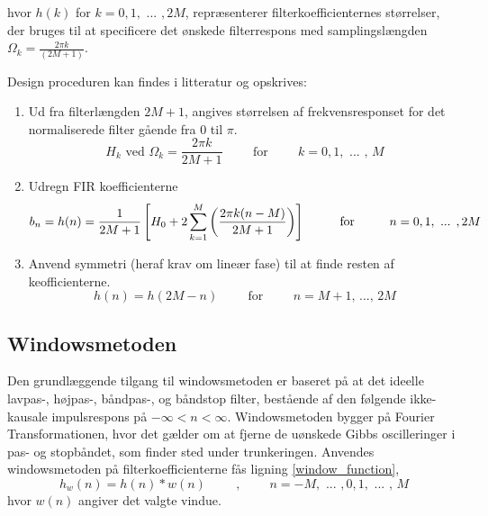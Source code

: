 hvor $h(k)$ for $k=0,1,\text{ ... },2M$, repræsenterer filterkoefficienternes størrelser, der bruges til at specificere det ønskede filterrespons med samplingslængden $\Omega_{k}=\frac{2\pi k}{(2M+1)}$.

Design proceduren kan findes i litteratur \cite[Side. 263]{Tan2013} og opskrives:\\
\begin{enumerate}
\item Ud fra filterlængden $2M+1$, angives størrelsen af frekvensresponset for det normaliserede filter gående fra $0$ til $\pi$.
\begin{equation}
	H_k \text{ ved } \Omega_{k} = \frac{2 \pi k}{2M+1} \hspace{1cm} \text{for} \hspace{1cm} k=0,1,\text{ ... , } M
\end{equation}
\item Udregn FIR koefficienterne
\begin{equation}
b_n = h(n)=\frac{1}{2M+1}\left[ H_{0}+2\sum_{k=1}^{M} \left( \frac{2\pi k(n-M)}{2M+1} \right) \right] \hspace{1cm} \text{for} \hspace{1 cm} n=0,1,\text{ ... },2M
\end{equation}
\item Anvend symmetri (heraf krav om lineær fase) til at finde resten af keofficienterne.
\begin{equation}
	h(n) = h(2M-n) \hspace{1cm} \text{for} \hspace{1cm} n=M+1 \text{, ..., } 2M
\end{equation}
\end{enumerate}

\subsection{Windowsmetoden}
Den grundlæggende tilgang til windowsmetoden er baseret på at det ideelle lavpas-, højpas-, båndpas-, og båndstop filter, bestående af den følgende ikke-kausale impulsrespons på $-\infty < n < \infty$. Windowsmetoden bygger på Fourier Transformationen, hvor det gælder om at fjerne de uønskede Gibbs oscilleringer i pas- og stopbåndet, som finder sted under trunkeringen. Anvendes windowsmetoden på filterkoefficienterne fås ligning \ref{window_function},
\begin{equation}
	h_w(n) = h(n)*w(n) \hspace{1cm}\text{,} \hspace{1cm}n=-M,\text{ ... },0, 1,\text{ ... , }M	
	\label{window_function}
\end{equation}
hvor $w(n)$ angiver det valgte vindue.

